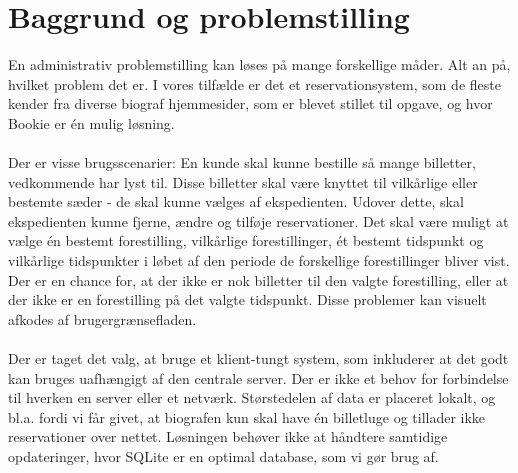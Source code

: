 \chapter{Baggrund og problemstilling}

En administrativ problemstilling kan løses på mange forskellige måder. Alt an på, hvilket problem det er. I vores tilfælde er det et reservationsystem, som de fleste kender fra diverse biograf hjemmesider, som er blevet stillet til opgave, og hvor Bookie er én mulig løsning.
\\\\
Der er visse brugsscenarier: En kunde skal kunne bestille så mange billetter, vedkommende har lyst til. Disse billetter skal være knyttet til vilkårlige eller bestemte sæder - de skal kunne vælges af ekspedienten. Udover dette, skal ekspedienten kunne fjerne, ændre og tilføje reservationer. Det skal være muligt at vælge én bestemt forestilling, vilkårlige forestillinger, ét bestemt tidspunkt og vilkårlige tidspunkter i løbet af den periode de forskellige forestillinger bliver vist.
Der er en chance for, at der ikke er nok billetter til den valgte forestilling, eller at der ikke er en forestilling på det valgte tidspunkt. Disse problemer kan visuelt afkodes af brugergrænsefladen.
\\\\
Der er taget det valg, at bruge et klient-tungt system, som inkluderer at det godt kan bruges uafhængigt af den centrale server. Der er ikke et behov for forbindelse til hverken en server eller et netværk. Størstedelen af data er placeret lokalt, og  bl.a. fordi vi får givet, at biografen kun skal have én billetluge og tillader ikke reservationer over nettet. Løsningen behøver ikke at håndtere samtidige opdateringer, hvor SQLite er en optimal database, som vi gør brug af.



